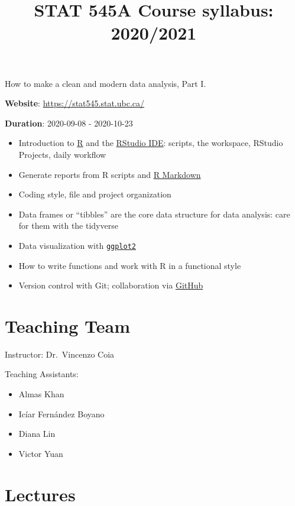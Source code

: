 \documentclass[
]{article}
\title{STAT 545A Course syllabus: 2020/2021}
\author{}
\date{\vspace{-2.5em}}
\providecommand{\tightlist}{%
  \setlength{\itemsep}{0pt}\setlength{\parskip}{0pt}}
\begin{document}
\maketitle

{
\setcounter{tocdepth}{2}
\tableofcontents
}
How to make a clean and modern data analysis, Part I.

\textbf{Website}: \url{https://stat545.stat.ubc.ca/}

\textbf{Duration}: 2020-09-08 - 2020-10-23

\begin{itemize}
\tightlist
\item
  Introduction to \href{http://www.r-project.org}{R} and the
  \href{http://www.rstudio.com/products/rstudio/}{RStudio IDE}: scripts,
  the workspace, RStudio Projects, daily workflow
\item
  Generate reports from R scripts and
  \href{http://rmarkdown.rstudio.com}{R Markdown}
\item
  Coding style, file and project organization
\item
  Data frames or ``tibbles'' are the core data structure for data
  analysis: care for them with the tidyverse
\item
  Data visualization with \href{http://ggplot2.org}{\texttt{ggplot2}}
\item
  How to write functions and work with R in a functional style
\item
  Version control with Git; collaboration via
  \href{https://github.com}{GitHub}
\end{itemize}

\hypertarget{teaching-team}{%
\section{Teaching Team}\label{teaching-team}}

Instructor: Dr.~Vincenzo Coia

Teaching Assistants:

\begin{itemize}
\tightlist
\item
  Almas Khan
\item
  Icíar Fernández Boyano
\item
  Diana Lin
\item
  Victor Yuan
\end{itemize}

\hypertarget{lectures}{%
\section{Lectures}\label{lectures}}
\end{document}
